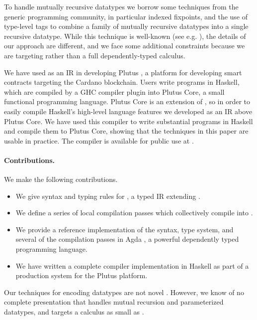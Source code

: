 To handle mutually recursive datatypes we borrow
some techniques from the generic programming community, in particular indexed
fixpoints, and the use of type-level tags to combine a family of mutually
recursive datatypes into a single recursive datatype. While this technique is
well-known (see e.g. \cite{fixmutualgeneric}), the details of our approach
are different, and we face some additional constraints because we are targeting \FOMF{}
rather than a full dependently-typed calculus.

We have used \FIR{} as an IR in developing Plutus \cite{plutusgithub}, a
platform for developing smart contracts targeting the Cardano blockchain. Users
write programs in Haskell, which are compiled by a GHC compiler plugin into
Plutus Core, a small functional programming language. Plutus Core is an extension
of \FOMF{}, so in order to easily compile Haskell's high-level language features we
developed \FIR{} as an IR above Plutus Core. We have used this compiler to write
substantial programs in Haskell and compile them to Plutus Core, showing that
the techniques in this paper are usable in practice. The compiler is available
for public use at \cite{plutusplayground}.

\paragraph{Contributions.}

We make the following contributions.

\begin{itemize}
  \item We give syntax and typing rules for \FIR{}, a typed IR
    extending \FOMF{}.
  \item We define a series of local compilation passes which
    collectively compile \FIR{} into \FOMF{}.
  \item We provide a reference implementation of the syntax, type system, and
    several of the compilation passes in Agda \cite{norell2007towards}, a powerful dependently
    typed programming language.
  \item We have written a complete compiler implementation in Haskell as part of
    a production system for the Plutus platform.
\end{itemize}

Our techniques for encoding datatypes are not novel
\cite{fixmutualgeneric}\cite{loh2011generic}. However, we
know of no complete presentation that handles mutual recursion and
parameterized datatypes, and targets a calculus as small as \FOMF{}.

